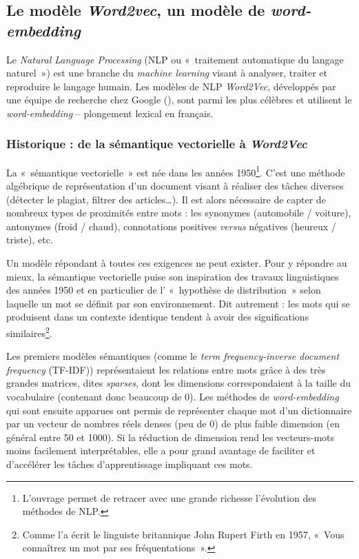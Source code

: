 \documentclass[11pt,french,french]{article}
\let\rmarkdownfootnote\footnote%
\def\footnote{\protect\rmarkdownfootnote}
\begin{document}
\hypertarget{le-moduxe8le-word2vec-un-moduxe8le-de-word-embedding}{%
\subsection{\texorpdfstring{Le modèle \emph{Word2vec}, un modèle de \emph{word-embedding}}{Le modèle Word2vec, un modèle de word-embedding}}\label{le-moduxe8le-word2vec-un-moduxe8le-de-word-embedding}}

Le \emph{Natural Language Processing} (NLP ou «~traitement automatique du langage naturel~») est une branche du \emph{machine learning} visant à analyser, traiter et reproduire le langage humain.
Les modèles de NLP \emph{Word2Vec}, développés par une équipe de recherche chez Google (\cite{Mikolov}), sont parmi les plus célèbres et utilisent le \emph{word-embedding} -- plongement lexical en français.

\hypertarget{historique-de-la-suxe9mantique-vectorielle-uxe0-word2vec}{%
\subsubsection{\texorpdfstring{Historique : de la sémantique vectorielle à \emph{Word2Vec}}{Historique : de la sémantique vectorielle à Word2Vec}}\label{historique-de-la-suxe9mantique-vectorielle-uxe0-word2vec}}

La «~sémantique vectorielle~» est née dans les années 1950\footnote{L'ouvrage \cite{Jurafsky} permet de retracer avec une grande richesse l'évolution des méthodes de NLP.}.
C'est une méthode algébrique de représentation d'un document visant à réaliser des tâches diverses (détecter le plagiat, filtrer des articles\dots).
Il est alors nécessaire de capter de nombreux types de proximités entre mots : les synonymes (automobile / voiture), antonymes (froid / chaud), connotations positives \emph{versus} négatives (heureux / triste), etc.

Un modèle répondant à toutes ces exigences ne peut exister.
Pour y répondre au mieux, la sémantique vectorielle puise son inspiration des travaux linguistiques des années 1950 et en particulier de l' «~hypothèse de distribution~» selon laquelle un mot se définit par son environnement.
Dit autrement : les mots qui se produisent dans un contexte identique tendent à avoir des significations similaires\footnote{Comme l'a écrit le linguiste britannique John Rupert Firth en 1957, «~Vous connaîtrez un mot par ses fréquentations~».}.

Les premiers modèles sémantiques (comme le \emph{term frequency-inverse document frequency} (TF-IDF)) représentaient les relations entre mots grâce à des très grandes matrices, dites \emph{sparses}, dont les dimensions correspondaient à la taille du vocabulaire (contenant donc beaucoup de 0). Les méthodes de \emph{word-embedding} qui sont ensuite apparues ont permis de représenter chaque mot d'un dictionnaire par un vecteur de nombres réels denses (peu de 0) de plus faible dimension (en général entre 50 et 1000).
Si la réduction de dimension rend les vecteurs-mots moins facilement interprétables, elle a pour grand avantage de faciliter et d'accélérer les tâches d'apprentissage impliquant ces mots.
\end{document}

